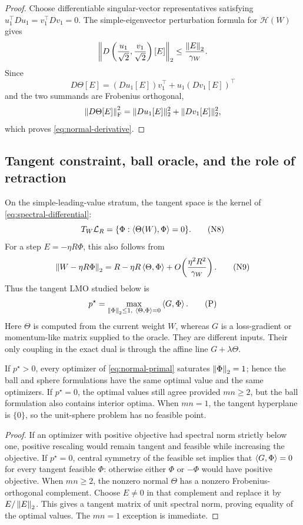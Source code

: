 \begin{proof}
Choose differentiable singular-vector representatives satisfying
\(u_1^\top Du_1=v_1^\top Dv_1=0\).  The simple-eigenvector perturbation
 formula for \(\mathcal H(W)\) gives
\[
 \left\|D\left(\frac{u_1}{\sqrt2},\frac{v_1}{\sqrt2}\right)[E]\right\|_2
 \le \frac{\left\lVert E\right\rVert_{2}}{\gamma_W}.
\]
Since
\[
 D\Theta[E]=(Du_1[E])v_1^\top+u_1(Dv_1[E])^\top
\]
and the two summands are Frobenius orthogonal,
\[
 \left\lVert D\Theta[E]\right\rVert_{\mathrm F}^2
 =\|Du_1[E]\|_2^2+\|Dv_1[E]\|_2^2,
\]
which proves \eqref{eq:normal-derivative}.
\end{proof}

\subsection{Tangent constraint, ball oracle, and the role of retraction}

On the simple-leading-value stratum, the tangent space is the kernel of
\eqref{eq:spectral-differential}:
\[
 T_W\mathcal L_R
 =
 \{\Phi:\left\langle \Theta(W),\Phi\right\rangle=0\}.
\tag{N8}
\label{eq:true-tangent-space}
\]
For a step \(E=-\eta R\Phi\), this also follows from
\[
 \left\lVert W-\eta R\Phi\right\rVert_{2}
 =
 R-\eta R\left\langle \Theta,\Phi\right\rangle
 +O\!\left(\frac{\eta^2R^2}{\gamma_W}\right).
\tag{N9}
\]
Thus the tangent LMO studied below is
\[
 p^\star
 =
 \max_{\left\lVert \Phi\right\rVert_{2}\le1,\ \left\langle \Theta,\Phi\right\rangle=0}
 \left\langle G,\Phi\right\rangle.
\tag{P}
\label{eq:normal-primal}
\]
Here \(\Theta\) is computed from the current weight \(W\), whereas \(G\) is a
loss-gradient or momentum-like matrix supplied to the oracle.  They are
different inputs.  Their only coupling in the exact dual is through the affine
line \(G+\lambda\Theta\).

\begin{lemma}
\label{lem:ball-sphere}
If \(p^\star>0\), every optimizer of \eqref{eq:normal-primal} saturates
\(\left\lVert \Phi\right\rVert_{2}=1\); hence the ball and sphere formulations have the same
optimal value and the same optimizers.  If \(p^\star=0\), the optimal values
still agree provided \(mn\ge2\), but the ball formulation also contains
interior optima.  When \(mn=1\), the tangent hyperplane is \(\{0\}\), so the
unit-sphere problem has no feasible point.
\end{lemma}

\begin{proof}
If an optimizer with positive objective had spectral norm strictly below one,
positive rescaling would remain tangent and feasible while increasing the
objective.  If \(p^\star=0\), central symmetry of the feasible set implies
that \(\left\langle G,\Phi\right\rangle=0\) for every tangent feasible \(\Phi\): otherwise either
\(\Phi\) or \(-\Phi\) would have positive objective.  When \(mn\ge2\), the
nonzero normal \(\Theta\) has a nonzero Frobenius-orthogonal complement.
Choose \(E\ne0\) in that complement and replace it by
\(E/\left\lVert E\right\rVert_{2}\).  This gives a tangent matrix of unit spectral norm, proving
equality of the optimal values.  The \(mn=1\) exception is immediate.
\end{proof}

